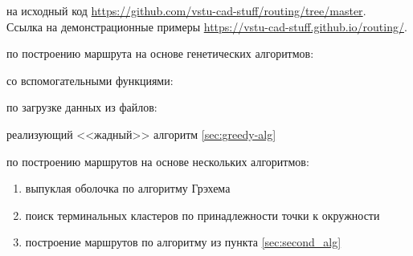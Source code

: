 
 на исходный код \url{https://github.com/vstu-cad-stuff/routing/tree/master}.\\
Ссылка на демонстрационные примеры \url{https://vstu-cad-stuff.github.io/routing/}.

 по построению маршрута на основе генетических алгоритмов:


\pagebreak

 со вспомогательными функциями:


 по загрузке данных из файлов:


\pagebreak

 реализующий <<жадный>> алгоритм \ref{sec:greedy-alg}


\pagebreak

 по построению маршрутов на основе нескольких алгоритмов:
\begin{enumerate}
    \item выпуклая оболочка по алгоритму Грэхема
    \item поиск терминальных кластеров по принадлежности точки к окружности
    \item построение маршрутов по алгоритму из пункта \ref{sec:second_alg}
\end{enumerate}


